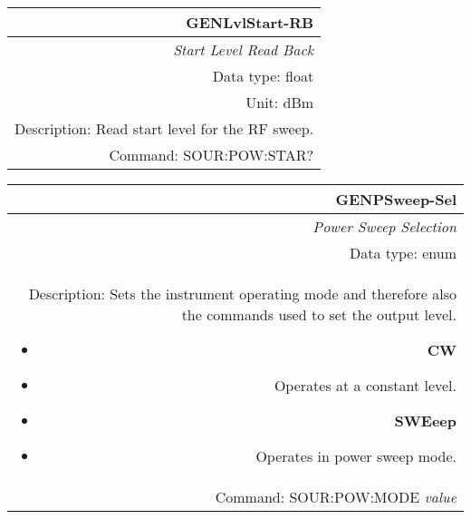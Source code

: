 \documentclass[openany]{article}
\begin{document}
		\begin{tabular}{N}
			\hline
			\bfseries GENLvlStart-RB \\ \hline
			\emph{Start Level Read Back} \\
			Data type: float \\
			Unit: dBm \\
			Description: Read start level for the RF sweep. \\
			Command: SOUR:POW:STAR? \\

		\end{tabular}
%
		\begin{tabular}{N}
			\hline
			\bfseries GENPSweep-Sel \\ \hline
			\emph{Power Sweep Selection} \\
			Data type: enum \\
			Description: Sets the instrument operating mode and therefore also the commands used to set the output level. \begin{itemize}[noitemsep]
				\item[] \textbf{CW} 
				\item[] Operates at a constant level.
				\item[] \textbf{SWEeep}
				\item[] Operates in power sweep mode.
			\end{itemize} \\
			Command: SOUR:POW:MODE \emph{value} \\

		\end{tabular}
\end{document}

